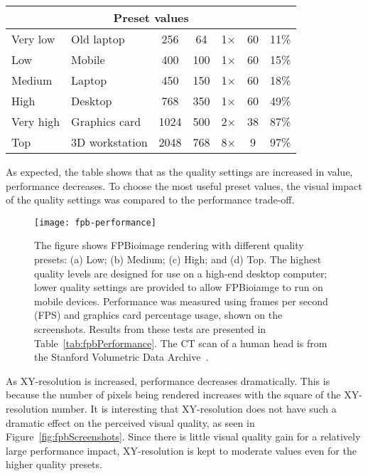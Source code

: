 \begin{table}
\begin{tabular}{|l l|c c c|c c|}
\multicolumn{7}{|c|}{\textbf{Preset values}} \\ \hline
Very low & Old laptop & 256 & 64 & 1$\times$ & 60 & 11\% \\
Low & Mobile & 400 & 100 & 1$\times$ & 60 & 15\% \\
Medium & Laptop & 450 & 150 & 1$\times$ & 60 & 18\% \\
High & Desktop & 768 & 350 & 1$\times$ & 60 & 49\% \\
Very high & Graphics card & 1024 & 500 & 2$\times$ & 38 & 87\% \\
Top & 3D workstation & 2048 & 768 & 8$\times$ & 9 & 97\% \\
\hline

\end{tabular}
\end{table}

As expected, the table shows that as the quality settings are increased in value, performance decreases. 
To choose the most useful preset values, the visual impact of the quality settings was compared to the performance trade-off. 

\begin{sidewaysfigure}[p]
\centering
\texttt{[image: fpb-performance]}
\caption[FPBioimage: Adjustable quality settings allow FPBioimage to be used on a range of devices]{The figure shows FPBioimage rendering with different quality presets: (a) Low; (b) Medium; (c) High; and (d) Top. The highest quality levels are designed for use on a high-end desktop computer; lower quality settings are provided to allow FPBioiamge to run on mobile devices. Performance was measured using frames per second (FPS) and graphics card percentage usage, shown on the screenshots. Results from these tests are presented in Table~\ref{tab:fpbPerformance}. The CT scan of a human head is from the Stanford Volumetric Data Archive~\cite{levoy1988volume}. }
\label{fig:fpb-quality}
\end{sidewaysfigure}

As XY-resolution is increased, performance decreases dramatically. 
This is because the number of pixels being rendered increases with the square of the XY-resolution number. 
It is interesting that XY-resolution does not have such a dramatic effect on the perceived visual quality, as seen in Figure~\ref{fig:fpbScreenshots}. 
Since there is little visual quality gain for a relatively large performance impact, XY-resolution is kept to moderate values even for the higher quality presets. 

